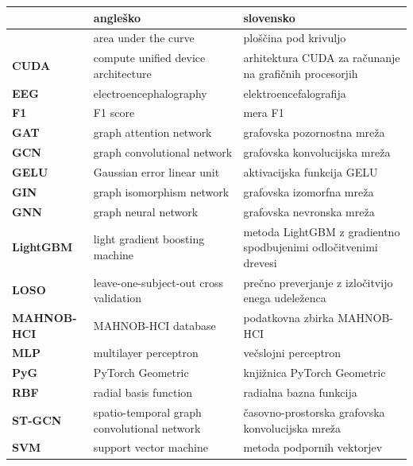 {\footnotesize
\centering
\begin{tabular}{>{\raggedright\arraybackslash}p{}|>{\raggedright\arraybackslash}p{}|>{\raggedright\arraybackslash}p{}}
  {\bf kratica} & {\bf angleško} & {\bf slovensko} \\ \hline
  \midrule
  {\bf AUC} & area under the curve & ploščina pod krivuljo \\
  \midrule
  {\bf CUDA} & compute unified device architecture & arhitektura CUDA za računanje na grafičnih procesorjih \\
  \midrule
  {\bf EEG} & electroencephalography & elektroencefalografija \\
  \midrule
  {\bf F1} & F1 score & mera F1 \\
  \midrule
  {\bf GAT} & graph attention network & grafovska pozornostna mreža \\
  \midrule
  {\bf GCN} & graph convolutional network & grafovska konvolucijska mreža \\
  \midrule
  {\bf GELU} & Gaussian error linear unit & aktivacijska funkcija GELU \\
  \midrule
  {\bf GIN} & graph isomorphism network & grafovska izomorfna mreža \\
  \midrule
  {\bf GNN} & graph neural network & grafovska nevronska mreža \\
  \midrule
  {\bf LightGBM} & light gradient boosting machine & metoda LightGBM z gradientno spodbujenimi odločitvenimi drevesi \\
  \midrule
  {\bf LOSO} & leave-one-subject-out cross validation &  prečno preverjanje z izločitvijo enega udeleženca\\
  \midrule
  {\bf MAHNOB-HCI} & MAHNOB-HCI database & podatkovna zbirka MAHNOB-HCI \\
  \midrule
  {\bf MLP} & multilayer perceptron & večslojni perceptron \\
  \midrule
  {\bf PyG} & PyTorch Geometric & knjižnica PyTorch Geometric \\
  \midrule
  {\bf RBF} & radial basis function & radialna bazna funkcija \\
  \midrule
  {\bf ST-GCN} & spatio-temporal graph convolutional network & časovno-prostorska grafovska konvolucijska mreža \\
  \midrule
  {\bf SVM} & support vector machine & metoda podpornih vektorjev \\
\end{tabular}
}
